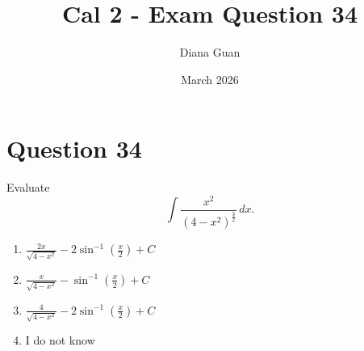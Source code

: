 \documentclass{article}
\title{\textbf{Cal 2 - Exam Question 34}}
\author{Diana Guan}
\date{March 2026}
\newcommand{\questionanchor}[1]{\hypertarget{q:#1}{}}
\begin{document}
\maketitle

    \questionanchor{34}
    \section*{Question 34}
    Evaluate
    \[
    \displaystyle\int \frac{x^2}{(4-x^2)^{\frac{3}{2}}}\, dx.
    \]
    
    \begin{enumerate}[label = \alph*.]
        \item $\displaystyle \frac{2x}{\sqrt{4-x^2}} - 2\sin^{-1}\!\left(\frac{x}{2}\right) + C$
        \item $\displaystyle \frac{x}{\sqrt{4-x^2}} - \sin^{-1}\!\left(\frac{x}{2}\right) + C$
        \item $\displaystyle \frac{4}{\sqrt{4-x^2}} - 2\sin^{-1}\!\left(\frac{x}{2}\right) + C$
        \item I do not know
    \end{enumerate}
\end{document}

